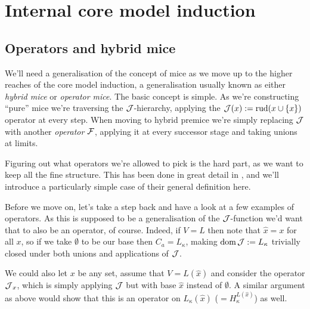 \documentclass[../../main]{subfiles}
\begin{document}
\chapter{Internal core model induction}
\thispagestyle{fancy}


\section{Operators and hybrid mice}

We'll need a generalisation of the concept of mice as we move up to the higher reaches of the core model induction, a generalisation usually known as either \textit{hybrid mice} or \textit{operator mice}. The basic concept is simple. As we're constructing ``pure'' mice we're traversing the $\operatorname{\mathcal J}$-hierarchy, applying the $\operatorname{\mathcal J}(x):=\operatorname{rud}(x\cup\{x\})$ operator at every step. When moving to hybrid premice we're simply replacing $\operatorname{\mathcal J}$ with another \textit{operator} $\operatorname{\mathcal F}$, applying it at every successor stage and taking unions at limits.

\qquad Figuring out what operators we're allowed to pick is the hard part, as we want to keep all the fine structure. This has been done in great detail in \cite{SchlutzenbergTrang}, and we'll introduce a particularly simple case of their general definition here.



Before we move on, let's take a step back and have a look at a few examples of operators. As this is supposed to be a generalisation of the $\operatorname{\mathcal J}$-function we'd want that to also be an operator, of course. Indeed, if $V=L$ then note that $\hat x=x$ for all $x$, so if we take $\emptyset$ to be our base then $C_a=L_\kappa$, making $\operatorname{dom}\operatorname{\mathcal J}:=L_\kappa$ trivially closed under both unions and applications of $\operatorname{\mathcal J}$.

\qquad We could also let $x$ be any set, assume that $V=L(\hat x)$ and consider the operator $\operatorname{\mathcal J}_x$, which is simply applying $\operatorname{\mathcal J}$ but with base $\hat x$ instead of $\emptyset$. A similar argument as above would show that this is an operator on $L_\kappa(\hat x)$ ($=H_\kappa^{L(\hat x)}$) as well.
\end{document}
